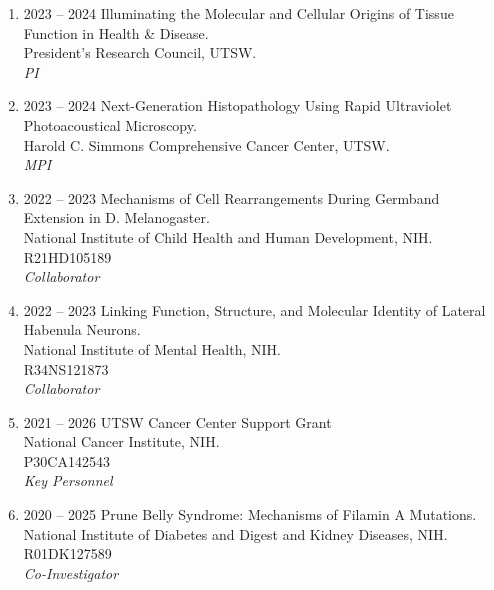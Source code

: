 \begin{enumerate}
[leftmargin=!,
labelindent=0pt,
itemindent=-66pt,
label=\textbullet]

\item 2023 -- 2024 
\hspace{8pt}
Illuminating the Molecular and Cellular Origins of Tissue Function in Health \& Disease.\\
President’s Research Council, UTSW.\\
{\it PI}

\item 2023 -- 2024 
\hspace{8pt}
Next-Generation Histopathology Using Rapid Ultraviolet Photoacoustical Microscopy. \\
Harold C. Simmons Comprehensive Cancer Center, UTSW. \\
{\it MPI}

\item 2022 -- 2023 
\hspace{8pt}
Mechanisms of Cell Rearrangements During Germband Extension in D. Melanogaster.\\
National Institute of Child Health and Human Development, NIH. \\
R21HD105189 \\
{\it Collaborator}


\item 2022 -- 2023 
\hspace{8pt}
Linking Function, Structure, and Molecular Identity of Lateral Habenula Neurons. \\
National Institute of Mental Health, NIH. \\
R34NS121873 \\
{\it Collaborator}

\item 2021 -- 2026 
\hspace{8pt}
UTSW Cancer Center Support Grant \\
National Cancer Institute, NIH. \\
P30CA142543 \\ 
{\it Key Personnel}


\item 2020 -- 2025 
\hspace{8pt} 
Prune Belly Syndrome: Mechanisms of Filamin A Mutations. \\
National Institute of Diabetes and Digest and Kidney Diseases, NIH. \\
R01DK127589 \\
{\it Co-Investigator} 


\end{enumerate}
